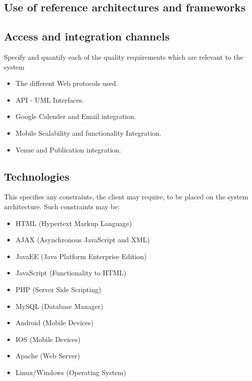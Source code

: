 \documentclass[a4paper]{article}
\begin{document}
\begin{itemize}
	\subsection{Use of reference architectures and frameworks}
	\subsection{Access and integration channels}
	Specify and quantify each of the quality requirements which are relevant to the system
	
			\begin{itemize}
				\item The different Web protocols used.
				\item API - UML Interfaces.
				\item Google Calender and Email integration.
				\item Mobile Scalability and functionality Integration.
				\item Venue and Publication integration.
				\\
			\end{itemize}
	\end{itemize}
	

	\subsection{Technologies}
	This specifies any constraints, the client may require, to be placed on the system architecture. Such constraints may be:
	\begin{itemize}
		\item HTML (Hypertext Markup Language)
		\item AJAX (Asynchronous JavaScript and XML)
		\item JavaEE (Java Platform Enterprise Edition)
		\item JavaScript (Functionality to HTML)
		\item PHP (Server Side Scripting)
		\item MySQL (Database Manager)
		\item Android (Mobile Devices)
		\item IOS (Mobile Devices)
		\item Apache (Web Server)
		\item Linux/Windows (Operating System)
		\\
		\\
	\end{itemize}
	\pagebreak
\end{document}
